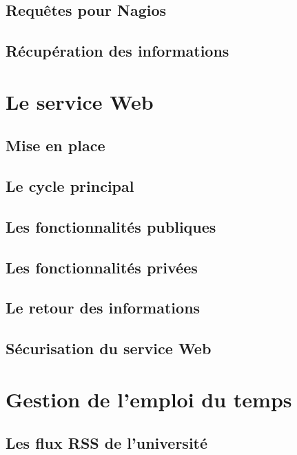 \subsection{Requ\^etes pour Nagios}

\subsection{R\'ecup\'eration des informations}

\section{Le service Web}

\subsection{Mise en place}

\subsection{Le cycle principal}

\subsection{Les fonctionnalit\'es publiques}

\subsection{Les fonctionnalit\'es priv\'ees}

\subsection{Le retour des informations}

\subsection{S\'ecurisation du service Web}

\section{Gestion de l'emploi du temps}

\subsection{Les flux RSS de l'universit\'e}

